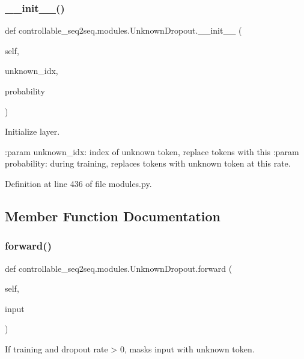 \subsubsection{\texorpdfstring{\+\_\+\+\_\+init\+\_\+\+\_\+()}{\_\_init\_\_()}}
{\footnotesize\ttfamily def controllable\+\_\+seq2seq.\+modules.\+Unknown\+Dropout.\+\_\+\+\_\+init\+\_\+\+\_\+ (\begin{DoxyParamCaption}\item[{}]{self,  }\item[{}]{unknown\+\_\+idx,  }\item[{}]{probability }\end{DoxyParamCaption})}

\begin{DoxyVerb}Initialize layer.

:param unknown_idx: index of unknown token, replace tokens with this
:param probability: during training, replaces tokens with unknown token
            at this rate.
\end{DoxyVerb}
 

Definition at line 436 of file modules.\+py.



\subsection{Member Function Documentation}
\mbox{\label{classcontrollable__seq2seq_1_1modules_1_1UnknownDropout_a875d78f9d759c57eaa5d42aab22ecaeb}} 
\subsubsection{\texorpdfstring{forward()}{forward()}}
{\footnotesize\ttfamily def controllable\+\_\+seq2seq.\+modules.\+Unknown\+Dropout.\+forward (\begin{DoxyParamCaption}\item[{}]{self,  }\item[{}]{input }\end{DoxyParamCaption})}

\begin{DoxyVerb}If training and dropout rate > 0, masks input with unknown token.\end{DoxyVerb}
 

